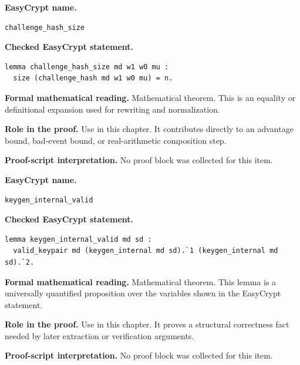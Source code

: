 \begin{formaltheorem}
\noindent\textbf{EasyCrypt name.}
\begin{lstlisting}[language=EasyCrypt,basicstyle=\ttfamily\scriptsize]
challenge_hash_size
\end{lstlisting}
\noindent\textbf{Checked EasyCrypt statement.}
\begin{lstlisting}[language=EasyCrypt,basicstyle=\ttfamily\scriptsize]
lemma challenge_hash_size md w1 w0 mu :
  size (challenge_hash md w1 w0 mu) = n.
\end{lstlisting}
\noindent\textbf{Formal mathematical reading.}
Mathematical theorem. This is an equality or definitional expansion used for rewriting and normalization.

\noindent\textbf{Role in the proof.}
Use in this chapter. It contributes directly to an advantage bound, bad-event bound, or real-arithmetic composition step.

\noindent\textbf{Proof-script interpretation.}
No proof block was collected for this item.

\end{formaltheorem}

\begin{formaltheorem}
\noindent\textbf{EasyCrypt name.}
\begin{lstlisting}[language=EasyCrypt,basicstyle=\ttfamily\scriptsize]
keygen_internal_valid
\end{lstlisting}
\noindent\textbf{Checked EasyCrypt statement.}
\begin{lstlisting}[language=EasyCrypt,basicstyle=\ttfamily\scriptsize]
lemma keygen_internal_valid md sd :
  valid_keypair md (keygen_internal md sd).`1 (keygen_internal md sd).`2.
\end{lstlisting}
\noindent\textbf{Formal mathematical reading.}
Mathematical theorem. This lemma is a universally quantified proposition over the variables shown in the EasyCrypt statement.

\noindent\textbf{Role in the proof.}
Use in this chapter. It proves a structural correctness fact needed by later extraction or verification arguments.

\noindent\textbf{Proof-script interpretation.}
No proof block was collected for this item.

\end{formaltheorem}

